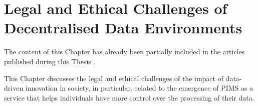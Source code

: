 \chapter{Legal and Ethical Challenges of Decentralised Data Environments}
\label{chap:legal}

\begin{tcolorbox}[colback=royallavender!40]
The content of this Chapter has already been partially included in the articles published during this Thesis \citep{esteves_fostering_2022,asgarinia_who_2023,florea_is_2023}.
\end{tcolorbox}

This Chapter discusses the legal and ethical challenges of the impact of data-driven innovation in society, in particular, related to the emergence of PIMS as a service that helps individuals have more control over the processing of their data.




